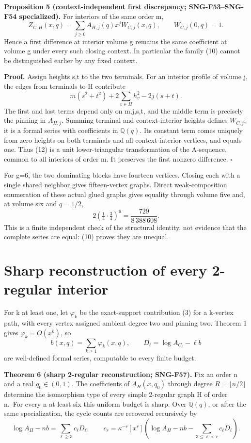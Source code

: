 \documentclass[
  11pt,
  a4paper,
]{article}
\begin{document}
\textbf{Proposition 5 (context-independent first discrepancy;
SNG-F53--SNG-F54 specialized).} For interiors of the same order m, \[
Z_{C,H}(x,q)=\sum_{j\ge0} A_{H,j}(q)x^j W_{C,j}(x,q),
\qquad W_{C,j}(0,q)=1.
\tag{12}
\] Hence a first difference at interior volume g remains the same
coefficient at volume g under every such closing context. In particular
the family (10) cannot be distinguished earlier by any fixed context.

\textbf{Proof.} Assign heights s,t to the two terminals. For an interior
profile of volume j, the edges from terminals to H contribute \[
m(s^2+t^2)+2\sum_{v\in H}h_v^2-2j(s+t).
\] The first and last terms depend only on m,j,s,t, and the middle term
is precisely the pinning in \(A_{H,j}\). Summing terminal and
context-interior heights defines \(W_{C,j}\); it is a formal series with
coefficients in \(\mathbb Q(q)\). Its constant term comes uniquely from
zero heights on both terminals and all context-interior vertices, and
equals one. Thus (12) is a unit lower-triangular transformation of the
A-sequence, common to all interiors of order m. It preserves the first
nonzero difference. \(\square\)

For g=6, the two dominating blocks have fourteen vertices. Closing each
with a single shared neighbor gives fifteen-vertex graphs. Direct
weak-composition enumeration of these actual glued graphs gives equality
through volume five and, at volume six and \(q=1/2\), \[
2(\tfrac14\cdot\tfrac34)^6
=\frac{729}{8\,388\,608}.
\] This is a finite independent check of the structural identity, not
evidence that the complete series are equal: (10) proves they are
unequal.

\hypertarget{sharp-reconstruction-of-every-2-regular-interior}{%
\section{Sharp reconstruction of every 2-regular
interior}\label{sharp-reconstruction-of-every-2-regular-interior}}

For k at least one, let \(\varphi_k\) be the exact-support contribution
(3) for a k-vertex path, with every vertex assigned ambient degree two
and pinning two. Theorem 1 gives \(\varphi_k=O(x^k)\), so \[
b(x,q)=\sum_{k\ge1}\varphi_k(x,q),\qquad
D_\ell=\log A_{C_\ell}-\ell b
\tag{13}
\] are well-defined formal series, computable to every finite budget.

\textbf{Theorem 6 (sharp 2-regular reconstruction; SNG-F57).} Fix an
order n and a real \(q_0\in(0,1)\). The coefficients of \(A_H(x,q_0)\)
through degree \(R=\lfloor n/2\rfloor\) determine the isomorphism type
of every simple 2-regular graph H of order n.~For every n at least six
this uniform budget is sharp. Over \(\mathbb Q(q)\), or after the same
specialization, the cycle counts are recovered recursively by \[
\log A_H-nb=\sum_{\ell\ge3}c_\ell D_\ell,
\qquad
c_r=\kappa^{-r}[x^r]\left(\log A_H-nb-\sum_{3\le\ell<r}c_\ell D_\ell\right).
\tag{14}
\]
\end{document}
